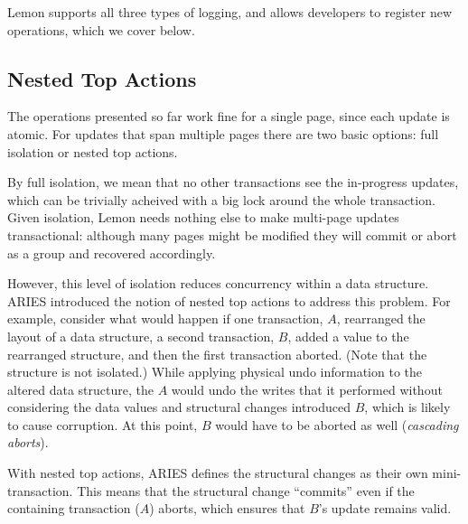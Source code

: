 \documentclass[letterpaper,twocolumn,english]{article}
\newcommand{\yad}{Lemon\xspace}
\begin{document}

\yad supports all three types of logging, and allows developers to
register new operations, which we cover below.


\subsection{Nested Top Actions}
\label{nested-top-actions}

The operations presented so far work fine for a single page, since
each update is atomic.  For updates that span multiple pages there are two basic options: full isolation or nested top actions.

By full isolation, we mean that no other transactions see the
in-progress updates, which can be trivially acheived with a big lock
around the whole transaction.  Given isolation, \yad needs nothing else to
make multi-page updates transactional: although many pages might be
modified they will commit or abort as a group and recovered
accordingly.

However, this level of isolation reduces concurrency within a data
structure.  ARIES introduced the notion of nested top actions to
address this problem.  For example, consider what would happen if one
transaction, $A$, rearranged the layout of a data structure, a second
transaction, $B$, added a value to the rearranged structure, and then
the first transaction aborted.  (Note that the structure is not
isolated.)  While applying physical undo information to the altered
data structure, the $A$ would undo the writes that it performed
without considering the data values and structural changes introduced
$B$, which is likely to cause corruption.  At this point, $B$ would
have to be aborted as well ({\em cascading aborts}).

With nested top actions, ARIES defines the structural changes as their
own mini-transaction. This means that the structural change
``commits'' even if the containing transaction ($A$) aborts, which
ensures that $B$'s update remains valid.
\end{document}

